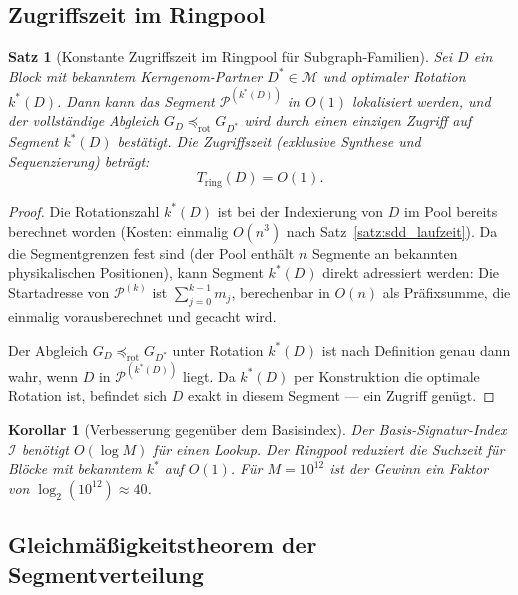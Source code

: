 ﻿\documentclass[a4paper,12pt]{article}
\theoremstyle{definition}
\theoremstyle{plain}
\newtheorem{satz}{Satz}[section]
\newtheorem{korollar}{Korollar}[section]
\begin{document}
\subsection{Zugriffszeit im Ringpool}
\label{ssec:ringpool_zugriff}

\begin{satz}[Konstante Zugriffszeit im Ringpool für Subgraph-Familien]
\label{satz:ringpool_zugriff}
  Sei $D$ ein Block mit bekanntem Kerngenom-Partner $D^* \in \mathcal{M}$
  und optimaler Rotation $k^*(D)$.  Dann kann das Segment
  $\mathcal{P}^{(k^*(D))}$ in $O(1)$ lokalisiert werden, und der
  vollständige Abgleich $G_D \preceq_{\mathrm{rot}} G_{D^*}$ wird durch
  einen einzigen Zugriff auf Segment $k^*(D)$ bestätigt.
  Die Zugriffszeit (exklusive Synthese und Sequenzierung) beträgt:
  \[
    T_{\mathrm{ring}}(D) = O(1).
  \]
\end{satz}

\begin{proof}
  Die Rotationszahl $k^*(D)$ ist bei der Indexierung von $D$ im Pool
  bereits berechnet worden (Kosten: einmalig $O(n^3)$ nach
  Satz~\ref{satz:sdd_laufzeit}).  Da die Segmentgrenzen fest sind
  (der Pool enthält $n$ Segmente an bekannten physikalischen Positionen),
  kann Segment $k^*(D)$ direkt adressiert werden: Die Startadresse von
  $\mathcal{P}^{(k)}$ ist $\sum_{j=0}^{k-1} m_j$, berechenbar in $O(n)$
  als Präfixsumme, die einmalig vorausberechnet und gecacht wird.

  Der Abgleich $G_D \preceq_{\mathrm{rot}} G_{D^*}$ unter Rotation $k^*(D)$
  ist nach Definition genau dann wahr, wenn $D$ in $\mathcal{P}^{(k^*(D))}$
  liegt.  Da $k^*(D)$ per Konstruktion die optimale Rotation ist,
  befindet sich $D$ exakt in diesem Segment --- ein Zugriff genügt. 
\end{proof}

\begin{korollar}[Verbesserung gegenüber dem Basisindex]
\label{kor:ringpool_verbesserung}
  Der Basis-Signatur-Index $\mathcal{I}$ benötigt $O(\log M)$ für einen
  Lookup.  Der Ringpool reduziert die Suchzeit für Blöcke mit bekanntem
  $k^*$ auf $O(1)$.  Für $M = 10^{12}$ ist der Gewinn ein Faktor von
  $\log_2(10^{12}) \approx 40$.
\end{korollar}

\subsection{Gleichmäßigkeitstheorem der Segmentverteilung}
\label{ssec:ringpool_gleichmaessigkeit}
\end{document}

